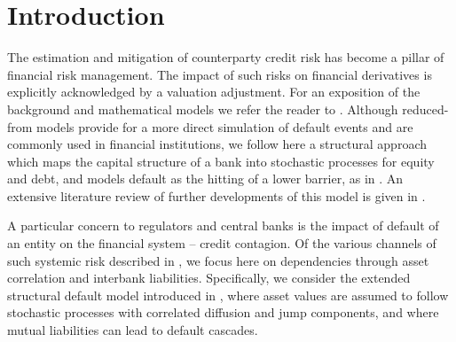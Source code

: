 \section{Introduction}




The estimation and mitigation of counterparty credit risk %
has become a pillar of financial risk management.
The impact of such risks on financial derivatives is explicitly acknowledged by a valuation adjustment.
For an exposition of the background and mathematical models we refer the reader to \cite{gregory2012counterparty}.
Although reduced-from models provide for a more direct simulation of default events and are commonly used in financial institutions, we follow here a structural approach which maps the capital structure of a bank into stochastic processes for equity and debt, and models default as the hitting of a lower barrier, as in \cite{BlackCox}.
An extensive literature review of further developments of this model is given in \cite{LiptonSepp}.

A particular concern to regulators and central banks is the impact of default of an entity on the financial system -- credit contagion. Of the various channels of such systemic risk described in \cite{hurd2016contagion}, we focus here on dependencies through asset correlation and interbank liabilities.
Specifically, we consider the extended structural default model introduced in \cite{Lipton2015}, where asset values are assumed to follow stochastic processes with correlated diffusion and jump components, and where mutual liabilities can lead to default cascades.


